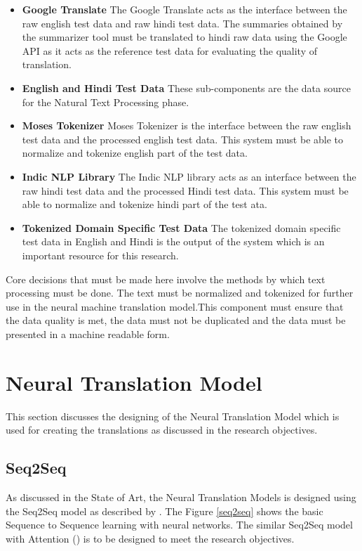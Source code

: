 \begin{itemize}
    \item \textbf{Google Translate} The Google Translate acts as the interface between the raw english test data and raw hindi test data. The summaries obtained by the summarizer tool must be translated to hindi raw data using the Google API as it acts as the reference test data for evaluating the quality of translation.
    \item \textbf{English and Hindi Test Data} These sub-components are the data source for the Natural Text Processing phase.
    \item \textbf{Moses Tokenizer} Moses Tokenizer is the interface between the raw english test data and the processed english test data. This system must be able to normalize and tokenize english part of the test data.
    \item \textbf{Indic NLP Library} The Indic NLP library acts as an interface between the raw hindi test data and the processed Hindi test data. This system must be able to normalize and tokenize hindi part of the test ata.
    \item\textbf{Tokenized Domain Specific Test Data} The tokenized domain specific test data in English and Hindi is the output of the system which is an important resource for this research.
\end{itemize}

Core decisions that must be made here involve the methods by which text processing must be done. The text must be normalized and tokenized for further use in the neural machine translation model.This component must ensure that the data quality is met, the data must not be duplicated and the data must be presented in a machine readable form.

\section{Neural Translation Model}

This section discusses the designing of the Neural Translation Model which is used for creating the translations as discussed in the research objectives. 

\subsection{Seq2Seq}
As discussed in the State of Art, the Neural Translation Models is designed using the Seq2Seq model as described by \cite{NIPS2014_5346}. The Figure \ref{seq2seq} shows the basic Sequence to Sequence learning with neural networks. The similar Seq2Seq model with Attention (\cite{DBLP:journals/corr/BahdanauCB14}) is to be designed to meet the research objectives.

